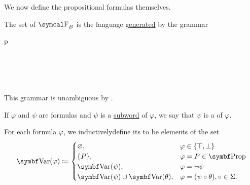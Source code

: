 \begin{definition}\label{def:propositional_language}\label{def:first_order_formula}
  We now define the propositional formulas themselves.

  \begin{DefEnum}
     The set of  \( \CF_B \) is the language \hyperref[def:grammar_derivation/grammar_language]{generated} by the grammar
    \begin{bnf*}
         {p \in {}} \\
       {\circ \in \Sigma} \\
          { \bnfor} \\
      \bnfmore             {\bnfts{\( \top \)} \bnfor \bnfts{\( \bot \)} \bnfor} \\
       \\
    \end{bnf*}

    This grammar is unambiguous by .

     If \( \varphi \) and \( \psi \) are formulas and \( \psi \) is a \hyperref[def:language/subword]{subword} of \( \varphi \), we say that \( \psi \) is a  of \( \varphi \).

     For each formula \( \varphi \), we inductively\IND define its  to be elements of the set
    \begin{equation}\label{def:propositional_language/var}
      \Bold{Var}(\varphi) \coloneqq \begin{cases}
        \varnothing,                              & \varphi \in \{ \top, \bot \}                     \\
        \{ P \},                                  & \varphi = P \in \Bold{Prop}                      \\
        \Bold{Var}(\psi),                         & \varphi = \neg \psi                              \\
        \Bold{Var}(\psi) \cup \Bold{Var}(\theta), & \varphi = (\psi \circ \theta), \circ \in \Sigma.
      \end{cases}
    \end{equation}
  \end{DefEnum}
\end{definition}

